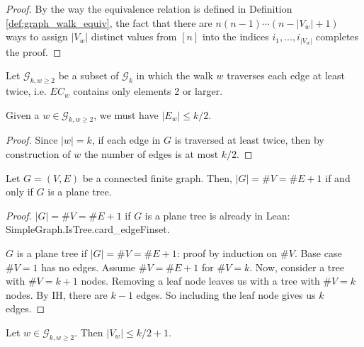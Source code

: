 \begin{proof}
  By the way the equivalence relation is defined in Definition \ref{def:graph_walk_equiv},
  the fact that there are $n (n - 1) \cdots (n -|V_w| + 1)$ ways to assign $|V_w|$ distinct values
  from $[n]$ into the indices $i_1,...,i_{|V_w|}$ completes the proof.
\end{proof}


\begin{definition}
  \label{def:g_k_ge_2}
  Let $\mathcal{G}_{k,w \geq 2}$ be a subset of $\mathcal{G}_k$ in which the walk $w$ traverses
  each edge at least twice, i.e. $EC_w$ contains only elements 2 or larger.
\end{definition}


\begin{lemma}
  \label{lem:edge_set_order_leq_k_over_two}
  Given a $w \in \mathcal{G}_{k,w \geq 2}$, we must have $|E_w| \leq k/2$.
\end{lemma}

\begin{proof}
  Since $|w| = k$, if each edge in $G$ is traversed at least twice, then by construction of $w$ the
   number of edges is at most $k/2$.
\end{proof}


\begin{proposition}
  \label{prop:vertex_edge_tree_equality}
  \notready
  Let $G=(V,E)$ be a connected finite graph. Then, $|G|=\#V=\#E+1$ if and only if $G$ is a plane tree.
\end{proposition}

\begin{proof}
  \notready
  $|G|=\#V=\#E+1$ if $G$ is a plane tree is already in Lean: SimpleGraph.IsTree.card\_edgeFinset.

  $G$ is a plane tree if $|G|=\#V=\#E+1$: proof by induction on $\#V$. Base case $\#V = 1$ has no edges.
  Assume $\#V = \#E + 1$ for $\#V = k$. Now, consider a tree with $\#V = k+1$ nodes. Removing a leaf
  node leaves us with a tree with $\#V = k$ nodes. By IH, there are $k - 1$ edges. So including the
  leaf node gives us $k$ edges.
\end{proof}


\begin{lemma}
  \label{lem:vertex_bound}
  Let $w \in \mathcal{G}_{k,w \geq 2}$. Then $|V_w| \le k/2 + 1$.
\end{lemma}

